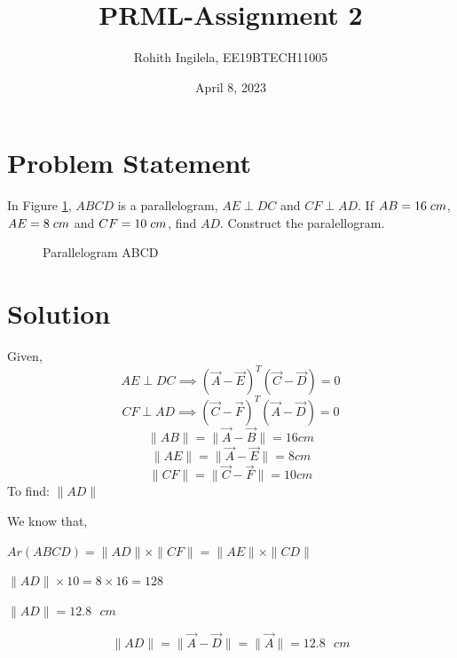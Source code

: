 \documentclass[letterpaper,12pt]{article}
\title{PRML-Assignment 2}
\author{Rohith Ingilela,  EE19BTECH11005 }
\date{April 8, 2023}
\begin{document}
\maketitle

\section{Problem Statement}

In Figure \ref*{fig:fig1}, $ABCD$ is a parallelogram, $AE \perp DC$
and $CF \perp AD$. If $AB = 16 \hspace{0.1cm} cm$, $AE = 8 \hspace{0.1cm} cm$ and
$CF = 10 \hspace{0.1cm} cm$, find $AD$. Construct the paralellogram.

\begin{figure}[!ht]
\centering


\caption{Parallelogram ABCD}
\label{fig:fig1}
\end{figure}
\section{Solution}

Given,
\begin{equation}
    AE \perp DC \implies (\Vec{A} - \Vec{E})^T (\Vec{C} - \Vec{D}) = 0
\end{equation}
\begin{equation}
    CF \perp AD \implies (\Vec{C} - \Vec{F})^T (\Vec{A} - \Vec{D}) = 0
\end{equation}
\begin{equation}
    \|AB\| = \|\Vec{A} - \Vec{B}\| = 16 cm
\end{equation}
\begin{equation}
    \|AE\| = \|\Vec{A} - \Vec{E}\| = 8 cm
\end{equation}
\begin{equation}
    \|CF\| = \|\Vec{C} - \Vec{F}\| = 10 cm
\end{equation}
To find: $\|AD\|$

\clearpage
We know that,
\begin{center}
    $Ar(ABCD) = \|AD\|\times\|CF\| = \|AE\|\times\|CD\|$ \\
\end{center}
\begin{center}
    $\|AD\| \times 10 = 8 \times 16 = 128$
\end{center}
\begin{center}
    $\|AD\| = 12.8 \text{ } cm$
\end{center}
\begin{equation}
\nonumber
    \|AD\| = \|\Vec{A} - \Vec{D}\| = \|\Vec{A}\| = 12.8 \text{ } cm
\end{equation}
\end{document}
